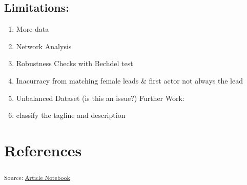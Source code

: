 \documentclass[
]{agujournal2019}
\providecommand{\tightlist}{%
  \setlength{\itemsep}{0pt}\setlength{\parskip}{0pt}}\usepackage{longtable,booktabs,array}
\begin{document}
\subsection{Limitations:}\label{limitations}

\begin{enumerate}
\def\labelenumi{\arabic{enumi}.}
\tightlist
\item
  More data
\item
  Network Analysis
\item
  Robustness Checks with Bechdel test
\item
  Inacurracy from matching female leads \& first actor not always the
  lead
\item
  Unbalanced Dataset (is this an issue?) Further Work:
\item
  classify the tagline and description
\end{enumerate}

\section*{References}\label{references}

\vspace{1em}

\textsubscript{Source:
\href{https://ehealy19.github.io/Matching_Movies/index.qmd.html}{Article
Notebook}}
\end{document}
